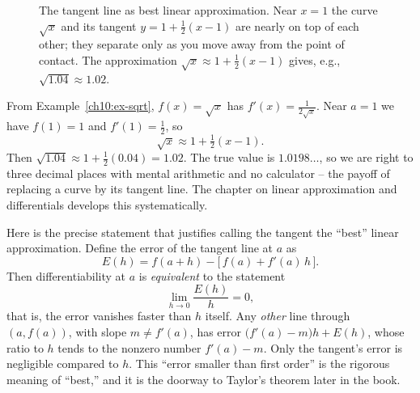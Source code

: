 \begin{figure}[h]
\centering
{}
\caption{The tangent line as best linear approximation. Near $x=1$ the curve
$\sqrt{x}$ and its tangent $y = 1 + \tfrac12(x-1)$ are nearly on top of each
other; they separate only as you move away from the point of contact. The
approximation $\sqrt{x} \approx 1 + \tfrac12(x-1)$ gives, e.g.,
$\sqrt{1.04} \approx 1.02$.}
\label{ch10:fig-linear}
\end{figure}

\begin{example}
\label{ch10:ex-approx}
From Example~\ref{ch10:ex-sqrt}, $f(x) = \sqrt{x}$ has $f'(x) = \tfrac{1}{2\sqrt
x}$. Near $a = 1$ we have $f(1) = 1$ and $f'(1) = \tfrac12$, so
\[
  \sqrt{x} \approx 1 + \tfrac12 (x - 1).
\]
Then $\sqrt{1.04} \approx 1 + \tfrac12(0.04) = 1.02$. The true value is
$1.0198\ldots$, so we are right to three decimal places with mental arithmetic and
no calculator -- the payoff of replacing a curve by its tangent line. The chapter
on linear approximation and differentials develops this systematically.
\end{example}

\begin{formalbox}
Here is the precise statement that justifies calling the tangent the ``best''
linear approximation. Define the error of the tangent line at $a$ as
\[
  E(h) = f(a + h) - \bigl[\, f(a) + f'(a)\,h \,\bigr].
\]
Then differentiability at $a$ is \emph{equivalent} to the statement
\[
  \lim_{h \to 0} \frac{E(h)}{h} = 0,
\]
that is, the error vanishes faster than $h$ itself. Any \emph{other} line through
$(a,f(a))$, with slope $m \neq f'(a)$, has error $\bigl(f'(a) - m\bigr) h + E(h)$,
whose ratio to $h$ tends to the nonzero number $f'(a) - m$. Only the tangent's
error is negligible compared to $h$. This ``error smaller than first order'' is
the rigorous meaning of ``best,'' and it is the doorway to Taylor's theorem later
in the book.
\end{formalbox}

